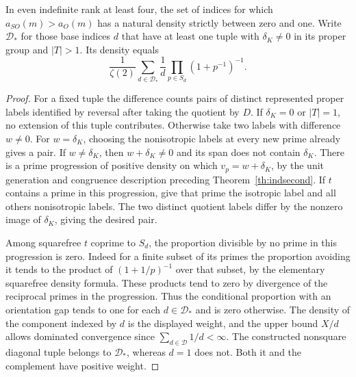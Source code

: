 \begin{corollary}
In even indefinite rank at least four, the set of indices for which \(a_{SO}(m)>a_O(m)\) has a natural density strictly between zero and one. Write \(\mathcal D_*\) for those base indices \(d\) that have at least one tuple with \(\delta_K\ne0\) in its proper group and \(|T|>1\). Its density equals
\[
 \frac1{\zeta(2)}\sum_{d\in\mathcal D_*}\frac1d
                   \prod_{p\in S_d}(1+p^{-1})^{-1}.
\]
\end{corollary}
\begin{proof}
For a fixed tuple the difference counts pairs of distinct represented proper labels identified by reversal after taking the quotient by \(D\). If \(\delta_K=0\) or \(|T|=1\), no extension of this tuple contributes. Otherwise take two labels with difference \(w\ne0\). For \(w=\delta_K\), choosing the nonisotropic labels at every new prime already gives a pair. If \(w\ne\delta_K\), then \(w+\delta_K\ne0\) and its span does not contain \(\delta_K\). There is a prime progression of positive density on which \(v_p=w+\delta_K\), by the unit generation and congruence description preceding Theorem~\ref{th:indsecond}. If \(t\) contains a prime in this progression, give that prime the isotropic label and all others nonisotropic labels. The two distinct quotient labels differ by the nonzero image of \(\delta_K\), giving the desired pair.

Among squarefree \(t\) coprime to \(S_d\), the proportion divisible by no prime in this progression is zero. Indeed for a finite subset of its primes the proportion avoiding it tends to the product of \((1+1/p)^{-1}\) over that subset, by the elementary squarefree density formula. These products tend to zero by divergence of the reciprocal primes in the progression. Thus the conditional proportion with an orientation gap tends to one for each \(d\in\mathcal D_*\) and is zero otherwise. The density of the component indexed by \(d\) is the displayed weight, and the upper bound \(X/d\) allows dominated convergence since \(\sum_{d\in\mathcal D}1/d<\infty\). The constructed nonsquare diagonal tuple belongs to \(\mathcal D_*\), whereas \(d=1\) does not. Both it and the complement have positive weight.
\end{proof}
